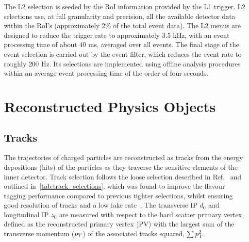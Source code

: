 The L2 selection is seeded by the RoI information provided by the L1 trigger. L2 selections use, at full granularity and precision, all the available detector data within the RoI’s (approximately 2\% of the total event data). The L2 menus are designed to reduce the trigger rate to approximately 3.5 kHz, with an event processing time of about 40 ms, averaged over all events. The final stage of the event selection is carried out by the event filter, which reduces the event rate to roughly 200 Hz. Its selections are implemented using offline analysis procedures within an average event processing time of the order of four seconds.








\section{Reconstructed Physics Objects}\label{sec:physics-objects}

\subsection{Tracks}\label{sec:tracks}

The trajectories of charged particles are reconstructed as tracks from the energy depositions (hits) of the particles as they traverse the sensitive elements of the inner detector.
Track selection follows the loose selection described in Ref.~\cite{ATL-PHYS-PUB-2020-014} and outlined in~\cref{tab:track_selections}, which was found to improve the flavour tagging performance compared to previous tighter selections, whilst ensuring good resolution of tracks and a low fake rate~\cite{PERF-2015-08}.
The transverse IP $d_0$ and longitudinal IP $z_0$ are measured with respect to the hard scatter primary vertex, defined as the reconstructed primary vertex (PV) with the largest sum of the transverse momentum ($p_{\text{T}}$) of the associated tracks squared, $\sum p_{\text{T}}^2$.

